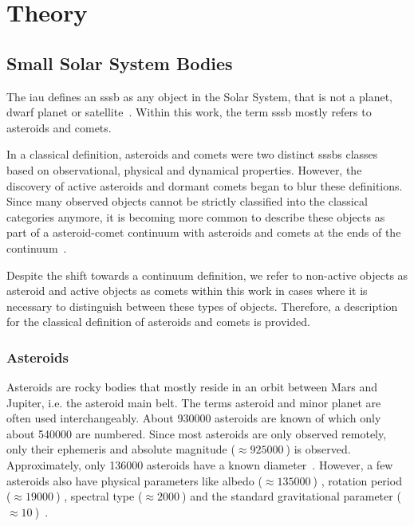 \section{Theory} \label{sec:theory}
%
%
%
%


\subsection{Small Solar System Bodies}
The \gls{iau} defines an \gls{sssb} as any object in the Solar System, that is not a planet, dwarf planet or satellite~\cite{iau_sssb}. Within this work, the term \gls{sssb} mostly refers to asteroids and comets.

In a classical definition, asteroids and comets were two distinct \glspl{sssb} classes based on observational, physical and dynamical properties. However, the discovery of active asteroids and dormant comets began to blur these definitions. Since many observed objects cannot be strictly classified into the classical categories anymore, it is becoming more common to describe these objects as part of a asteroid-comet continuum with asteroids and comets at the ends of the continuum~\cite{Hsieh2017Asteroid-cometSystem}.

Despite the shift towards a continuum definition, we refer to non-active objects as asteroid and active objects as comets within this work in cases where it is necessary to distinguish between these types of objects. Therefore, a description for the classical definition of asteroids and comets is provided.

\subsubsection{Asteroids}
Asteroids are rocky bodies that mostly reside in an orbit between Mars and Jupiter, i.e. the asteroid main belt. The terms asteroid and minor planet are often used interchangeably. About \SI{930000}{} asteroids are known of which only about \SI{540000}{} are numbered. Since most asteroids are only observed remotely, only their ephemeris and absolute magnitude ($\approx \SI{925000}{}$) is observed. Approximately, only \SI{136000}{} asteroids have a known diameter~\cite{JPLEngine}. However, a few asteroids also have physical parameters like albedo ($\approx \SI{135000}{}$) , rotation period ($\approx \SI{19000}{}$) , spectral type ($\approx \SI{2000}{}$) and the standard gravitational parameter ($\approx \SI{10}{}$)~\cite{JPLEngine}.

